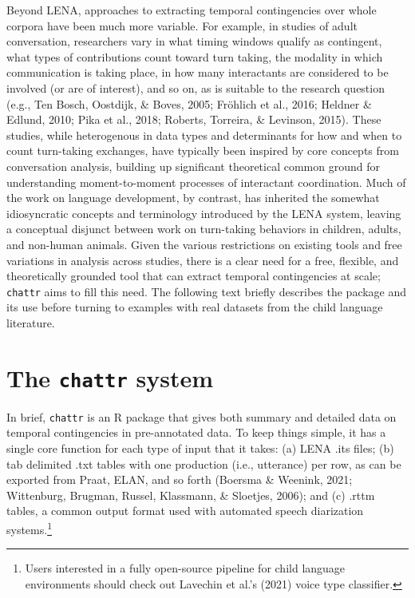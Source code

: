 \documentclass[10pt, letterpaper]{article}
\begin{document}
Beyond LENA, approaches to extracting temporal contingencies over whole
corpora have been much more variable. For example, in studies of adult
conversation, researchers vary in what timing windows qualify as
contingent, what types of contributions count toward turn taking, the
modality in which communication is taking place, in how many
interactants are considered to be involved (or are of interest), and so
on, as is suitable to the research question (e.g., Ten Bosch, Oostdijk,
\& Boves, 2005; Fröhlich et al., 2016; Heldner \& Edlund, 2010; Pika et
al., 2018; Roberts, Torreira, \& Levinson, 2015). These studies, while
heterogenous in data types and determinants for how and when to count
turn-taking exchanges, have typically been inspired by core concepts
from conversation analysis, building up significant theoretical common
ground for understanding moment-to-moment processes of interactant
coordination. Much of the work on language development, by contrast, has
inherited the somewhat idiosyncratic concepts and terminology introduced
by the LENA system, leaving a conceptual disjunct between work on
turn-taking behaviors in children, adults, and non-human animals. Given
the various restrictions on existing tools and free variations in
analysis across studies, there is a clear need for a free, flexible, and
theoretically grounded tool that can extract temporal contingencies at
scale; \texttt{chattr} aims to fill this need. The following text
briefly describes the package and its use before turning to examples
with real datasets from the child language literature.

\hypertarget{the-chattr-system}{%
\section{\texorpdfstring{The \texttt{chattr}
system}{The chattr system}}\label{the-chattr-system}}

In brief, \texttt{chattr} is an R package that gives both summary and
detailed data on temporal contingencies in pre-annotated data. To keep
things simple, it has a single core function for each type of input that
it takes: (a) LENA .its files; (b) tab delimited .txt tables with one
production (i.e., utterance) per row, as can be exported from Praat,
ELAN, and so forth (Boersma \& Weenink, 2021; Wittenburg, Brugman,
Russel, Klassmann, \& Sloetjes, 2006); and (c) .rttm tables, a common
output format used with automated speech diarization systems.\footnote{Users
  interested in a fully open-source pipeline for child language
  environments should check out Lavechin et al.'s (2021) voice type
  classifier.}
\end{document}
